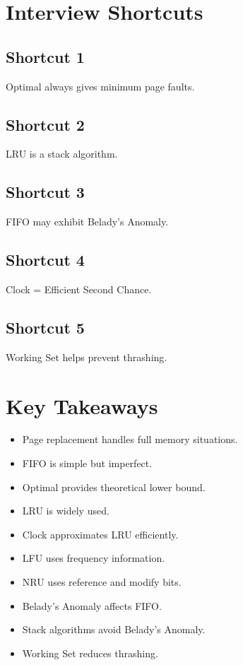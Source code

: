 \section{Interview Shortcuts}

\subsection{Shortcut 1}

Optimal always gives minimum page faults.

\subsection{Shortcut 2}

LRU is a stack algorithm.

\subsection{Shortcut 3}

FIFO may exhibit Belady's Anomaly.

\subsection{Shortcut 4}

Clock = Efficient Second Chance.

\subsection{Shortcut 5}

Working Set helps prevent thrashing.

\section{Key Takeaways}

\begin{itemize}
\item Page replacement handles full memory situations.
\item FIFO is simple but imperfect.
\item Optimal provides theoretical lower bound.
\item LRU is widely used.
\item Clock approximates LRU efficiently.
\item LFU uses frequency information.
\item NRU uses reference and modify bits.
\item Belady's Anomaly affects FIFO.
\item Stack algorithms avoid Belady's Anomaly.
\item Working Set reduces thrashing.
\end{itemize}

